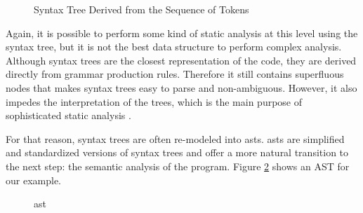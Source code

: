 \begin{figure}[ht]
    \centering
    \caption{Syntax Tree Derived from the Sequence of Tokens \cite{chess2007secure}}
    \label{fig:parse-tree}
\end{figure}

Again, it is possible to perform some kind of static analysis at this level using the syntax tree, but it is not the best data structure to perform complex analysis. Although syntax trees are the closest representation of the code, they are derived directly from grammar production rules. Therefore it still contains superfluous nodes that makes syntax trees easy to parse and non-ambiguous. However, it also impedes the interpretation of the trees, which is the main purpose of sophisticated static analysis \cite{chess2007secure, collin2015compilation}.

For that reason, syntax trees are often re-modeled into \glspl{ast}. \glspl{ast} are simplified and standardized versions of syntax trees and offer a more natural transition to the next step: the semantic analysis of the program. Figure \ref{fig:ast} shows an AST for our example.

\begin{figure}[ht]
    \centering
    \caption{\acrlong{ast} \cite{chess2007secure}}
    \label{fig:ast}
\end{figure}

